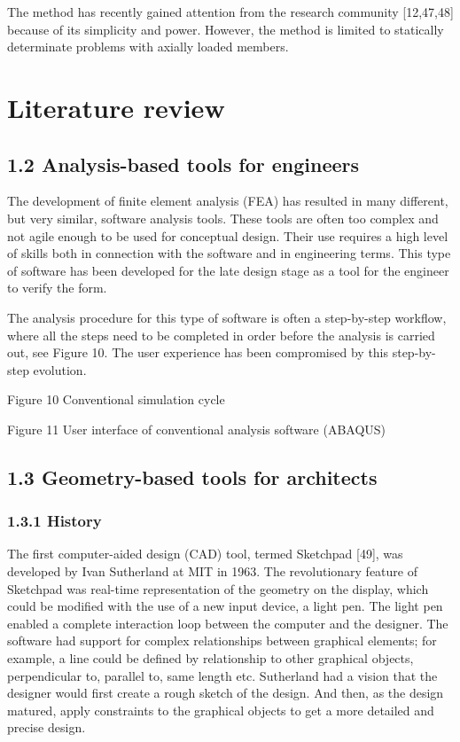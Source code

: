 The method has recently gained attention from the research community [12,47,48] because of its simplicity and power. However, the method is limited to statically determinate problems with axially loaded members. 



\section{Literature review}
\subsection[1.2 Analysis{}-based tools for engineers]{1.2 Analysis-based tools for engineers}
The development of finite element analysis (FEA) has resulted in many different, but very similar, software analysis tools. These tools are often too complex and not agile enough to be used for conceptual design. Their use requires a high level of skills both in connection with the software and in engineering terms. This type of software has been developed for the late design stage as a tool for the engineer to verify the form. 

 The analysis procedure for this type of software is often a step-by-step workflow, where all the steps need to be completed in order before the analysis is carried out, see Figure 10. The user experience has been compromised by this step-by-step evolution.


Figure 10 Conventional simulation cycle

Figure 11 User interface of conventional analysis software (ABAQUS)

\subsection[1.3 Geometry{}-based tools for architects]{1.3 Geometry-based tools for architects}
\subsubsection[1.3.1 History]{1.3.1 History}
The first computer-aided design (CAD) tool, termed Sketchpad [49], was developed by Ivan Sutherland at MIT in 1963. The revolutionary feature of Sketchpad was real-time representation of the geometry on the display, which could be modified with the use of a new input device, a light pen. The light pen enabled a complete interaction loop between the computer and the designer. The software had support for complex relationships between graphical elements; for example, a line could be defined by relationship to other graphical objects, perpendicular to, parallel to, same length etc. Sutherland had a vision that the designer would first create a rough sketch of the design. And then, as the design matured, apply constraints to the graphical objects to get a more detailed and precise design. 


